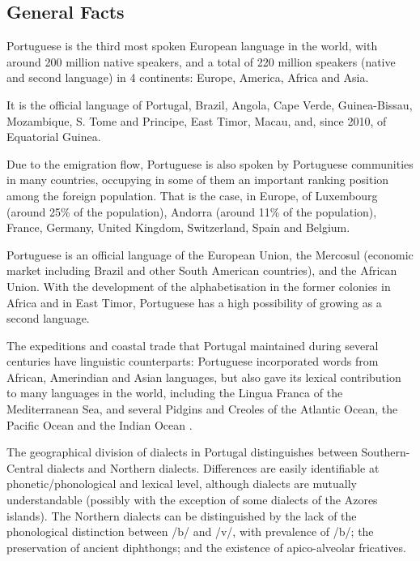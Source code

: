 \clearpage


\begin{multicols}{2}

\subsection{General Facts}

Portuguese is the third most spoken European language in the world, with around 200 million native speakers, and a total of 220 million speakers (native and second language) in 4 continents: Europe, America, Africa and Asia\cite{observatorio}\cite{ethnologue}. 

   It is the official language of Portugal, Brazil, Angola, Cape Verde, Guinea-Bissau, Mozambique, S. Tome and Principe, East Timor, Macau, and, since 2010, of Equatorial Guinea. 

   Due to the emigration flow\cite{stat1}\cite{obsemig}, Portuguese is also spoken by Portuguese communities in many countries, occupying in some of them an important ranking position among the foreign population. That is the case, in Europe, of Luxembourg (around 25\% of the population), Andorra (around 11\% of the population), France, Germany, United Kingdom, Switzerland, Spain and Belgium\cite{linha}.


 Portuguese is an official language of the European Union, the Mercosul (economic market including Brazil and other South American countries), and the African Union. With the development of the alphabetisation in the former colonies in Africa and in East Timor, Portuguese has a high possibility of growing as a second language. 

The expeditions and coastal trade that Portugal maintained during several centuries have linguistic counterparts: Portuguese incorporated words from African, Amerindian and Asian languages, but also gave its lexical contribution to many languages in the world, including the Lingua Franca of the Mediterranean Sea, and several Pidgins and Creoles of the Atlantic Ocean, the Pacific Ocean and the Indian Ocean\cite{andrade} \cite{camoes}.

   The geographical division of dialects in Portugal\cite{cintra} distinguishes between Southern-Central dialects and Northern dialects. Differences are easily identifiable at phonetic/phonological and lexical level, although dialects are mutually understandable (possibly with the exception of some dialects of the Azores islands). The Northern dialects can be distinguished by the lack of the phonological distinction between /b/ and /v/, with prevalence of /b/; the preservation of ancient diphthongs; and the existence of apico-alveolar fricatives. 


\end{multicols}
